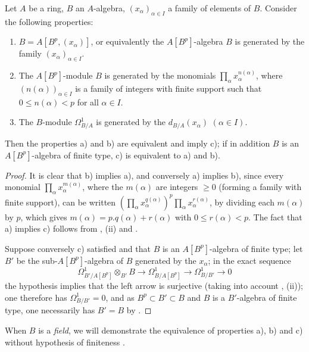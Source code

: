 \begin{proposition}[21.1.7]
\label{0.21.1.7}
Let $A$ be a ring, $B$ an $A$-algebra, $(x_\alpha)_{\alpha\in I}$ a family of elements of $B$.
Consider the following properties:
\begin{enumerate}
  \item[\rm a)] $B=A[B^p,(x_\alpha)]$, or equivalently the $A[B^p]$-algebra $B$ is generated by the family $(x_\alpha)_{\alpha\in I}$.
  \item[\rm b)] The $A[B^p]$-module $B$ is generated by the monomials $\prod_\alpha x_\alpha^{n(\alpha)}$, where $(n(\alpha))_{\alpha\in I}$ is a family of integers with finite support such that $0\leq n(\alpha)<p$ for all $\alpha\in I$.
  \item[\rm c)] The $B$-module $\Omega^1_{B/A}$ is generated by the $d_{B/A}(x_\alpha)$ $(\alpha\in I)$.
\end{enumerate}
Then the properties \textup{a)} and \textup{b)} are equivalent and imply \textup{c)}; if in addition $B$ is an $A[B^p]$-algebra of finite type, \textup{c)} is equivalent to \textup{a)} and \textup{b)}.
\end{proposition}

\begin{proof}
It is clear that b) implies a), and conversely a) implies b), since every monomial $\prod_\alpha x_\alpha^{m(\alpha)}$, where the $m(\alpha)$ are integers $\geq 0$ (forming a family with finite support), can be written $(\prod_\alpha x_\alpha^{q(\alpha)})^p\prod_\alpha x_\alpha^{r(\alpha)}$, by dividing each $m(\alpha)$ by $p$, which gives $m(\alpha)=p.q(\alpha)+r(\alpha)$ with $0\leq r(\alpha)<p$.
The fact that a) implies c) follows from , (ii) and .

Suppose conversely c) satisfied and that $B$ is an $A[B^p]$-algebra of finite type; let $B'$ be the sub-$A[B^p]$-algebra of $B$ generated by the $x_\alpha$; in the exact sequence 
\[
  \Omega^1_{B'/A[B^p]}\otimes_{B'}B\to\Omega^1_{B/A[B^p]}\to\Omega^1_{B/B'}\to 0
\]
the hypothesis implies that the left arrow is surjective (taking into account , (ii)); one therefore has $\Omega^1_{B/B'}=0$, and as $B^p\subset B'\subset B$ and $B$ is a $B'$-algebra of finite type, one necessarily has $B'=B$ by .
\end{proof}

\begin{remark}[21.1.8]
\label{0.21.1.8}
When $B$ is a \emph{field}, we will demonstrate the equivalence of properties a), b) and c) without hypothesis of finiteness .
\end{remark}

